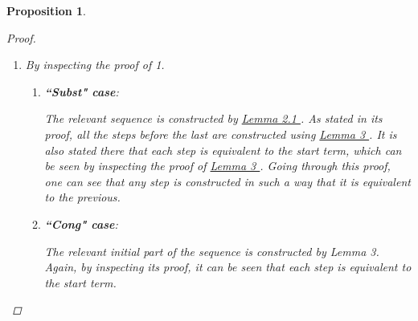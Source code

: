 \documentclass[11pt]{article} %
\newtheorem{proposition}{Proposition}
\begin{document}
\begin{proposition}
\begin{proof}
\begin{enumerate}
\begin{enumerate}
The desired sequence can be constructed as follows.

Terms immediately under $\mathcal{E}$ in its structure that are values in $prg$ but aren't values in $\langle prg \rangle$ need to be reduced to equivalent values first. For this, Lemma 3 can be applied multiple times to produce sequences that, starting with $\mathcal{E}[s^0]$ and always reducing the left-most such subterm, achieve exactly that. Thus we obtain an initial reduction $s \longrightarrow^*_{\langle prg \rangle} \widetilde{\mathcal{E}}[s^0]$ with $\widetilde{\mathcal{E}}[s^0] \sim \mathcal{E}[s^0]$.

By the induction hypothesis we have $s^0 \longrightarrow_{\langle prg \rangle} \widetilde{t^0}$, for a $\widetilde{t^0} \sim t^0$. By applying the congruence rule we get $\widetilde{\mathcal{E}}[s^0] \longrightarrow_{\langle prg \rangle} \widetilde{\mathcal{E}}[\widetilde{t^0}] \sim \mathcal{E}[\widetilde{t^0}] \sim \mathcal{E}[t^0]$.

\end{enumerate}

\item By inspecting the proof of 1.

\begin{enumerate}

\item \textbf{``Subst" case}:

The relevant sequence is constructed by \hyperref[lemma2]{ Lemma 2.1 }. As stated in its proof, all the steps before the last are constructed using \hyperref[lemma3]{ Lemma 3 }. It is also stated there that each step is equivalent to the start term, which can be seen by inspecting the proof of \hyperref[lemma3]{ Lemma 3 }. Going through this proof, one can see that any step is constructed in such a way that it is equivalent to the previous.

\item \textbf{``Cong" case}:

The relevant initial part of the sequence is constructed by Lemma 3. Again, by inspecting its proof, it can be seen that each step is equivalent to the start term.

\end{enumerate}

\end{enumerate}

\end{proof}

\end{proposition}
\end{document}
